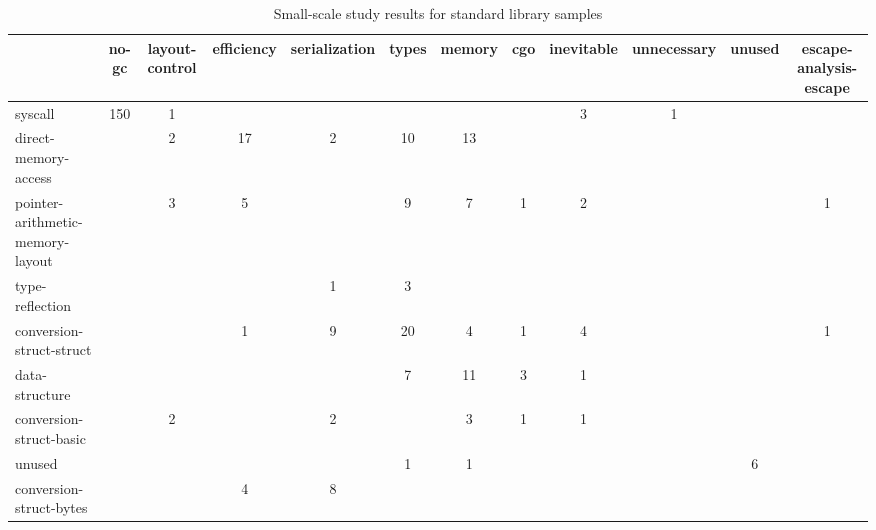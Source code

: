 \begin{table}[h]
    \centering
    \caption{Small-scale study results for standard library samples}
    \label{tbl:survey-small-results-std}
    \begin{tabularx}{\textwidth}{Xccccccccccc}
        \toprule
                                          & no-gc & layout-control & efficiency & serialization & types & memory & cgo & inevitable & unnecessary & unused & escape-analysis-escape \\
        \midrule
                                  syscall &   150 &              1 &            &               &       &        &     &          3 &           1 &        &                        \\
        \rowcolor{verylightgray}
                     direct-memory-access &       &              2 &         17 &             2 &    10 &     13 &     &            &             &        &                        \\
         pointer-arithmetic-memory-layout &       &              3 &          5 &               &     9 &      7 &   1 &          2 &             &        &                      1 \\
        \rowcolor{verylightgray}
                          type-reflection &       &                &            &             1 &     3 &        &     &            &             &        &                        \\
                 conversion-struct-struct &       &                &          1 &             9 &    20 &      4 &   1 &          4 &             &        &                      1 \\
        \rowcolor{verylightgray}
                           data-structure &       &                &            &               &     7 &     11 &   3 &          1 &             &        &                        \\
                  conversion-struct-basic &       &              2 &            &             2 &       &      3 &   1 &          1 &             &        &                        \\
        \rowcolor{verylightgray}
                                   unused &       &                &            &               &     1 &      1 &     &            &             &      6 &                        \\
                  conversion-struct-bytes &       &                &          4 &             8 &       &        &     &            &             &        &                        \\

\end{tabularx}
\end{table}
